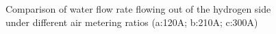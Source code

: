 \begin{figure}
	\label{fig:figure7}
	\caption{Comparison of water flow rate flowing out of the hydrogen side under different air metering ratios (a:120A; b:210A; c:300A)}
\end{figure}

